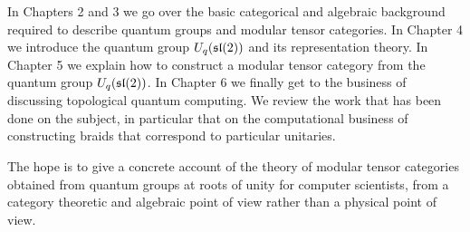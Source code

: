 In Chapters 2 and 3 we go over the basic categorical and algebraic background
required to describe quantum groups and modular tensor categories. In Chapter 4
we introduce the quantum group $U_q(\mathfrak{sl}(2))$ and its representation theory. In
Chapter 5 we explain how to construct a modular tensor category from the
quantum group $U_q(\mathfrak{sl}(2))$. In Chapter 6 we finally get to the business of
discussing topological quantum computing. We review the work that has been done
on the subject, in particular that on the computational business of
constructing braids that correspond to particular unitaries. 

The hope is to give a concrete account of the theory of modular tensor
categories obtained from quantum groups at roots of unity for computer
scientists, from a category theoretic and algebraic point of view rather than a
physical point of view. 
